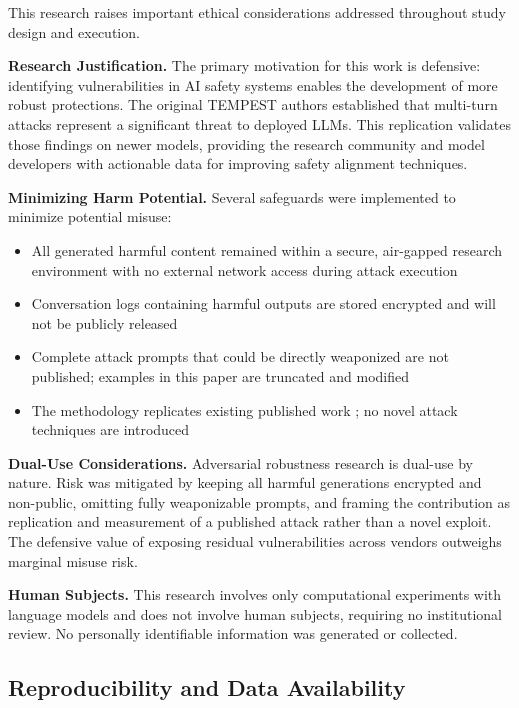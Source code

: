 \documentclass[11pt,a4paper]{article}
\begin{document}
This research raises important ethical considerations addressed throughout study design and execution.

\textbf{Research Justification.} The primary motivation for this work is defensive: identifying vulnerabilities in AI safety systems enables the development of more robust protections. The original TEMPEST authors \cite{zhou2025tempest} established that multi-turn attacks represent a significant threat to deployed LLMs. This replication validates those findings on newer models, providing the research community and model developers with actionable data for improving safety alignment techniques.

\textbf{Minimizing Harm Potential.} Several safeguards were implemented to minimize potential misuse:
\begin{itemize}
    \item All generated harmful content remained within a secure, air-gapped research environment with no external network access during attack execution
    \item Conversation logs containing harmful outputs are stored encrypted and will not be publicly released
    \item Complete attack prompts that could be directly weaponized are not published; examples in this paper are truncated and modified
    \item The methodology replicates existing published work \cite{zhou2025tempest}; no novel attack techniques are introduced
\end{itemize}

\textbf{Dual-Use Considerations.} Adversarial robustness research is dual-use by nature. Risk was mitigated by keeping all harmful generations encrypted and non-public, omitting fully weaponizable prompts, and framing the contribution as replication and measurement of a published attack rather than a novel exploit. The defensive value of exposing residual vulnerabilities across vendors outweighs marginal misuse risk.

\textbf{Human Subjects.} This research involves only computational experiments with language models and does not involve human subjects, requiring no institutional review. No personally identifiable information was generated or collected.

\subsection{Reproducibility and Data Availability}
\end{document}
